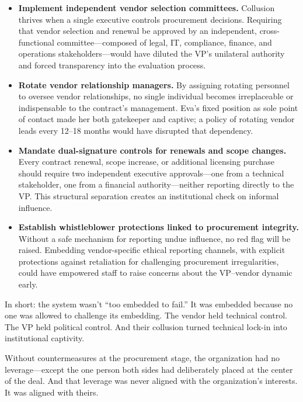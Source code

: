 \begin{itemize}
    \item \textbf{Implement independent vendor selection committees.} Collusion thrives when a single executive controls procurement decisions. Requiring that vendor selection and renewal be approved by an independent, cross-functional committee—composed of legal, IT, compliance, finance, and operations stakeholders—would have diluted the VP’s unilateral authority and forced transparency into the evaluation process.

    \item \textbf{Rotate vendor relationship managers.} By assigning rotating personnel to oversee vendor relationships, no single individual becomes irreplaceable or indispensable to the contract’s management. Eva’s fixed position as sole point of contact made her both gatekeeper and captive; a policy of rotating vendor leads every 12–18 months would have disrupted that dependency.

    \item \textbf{Mandate dual-signature controls for renewals and scope changes.} Every contract renewal, scope increase, or additional licensing purchase should require two independent executive approvals—one from a technical stakeholder, one from a financial authority—neither reporting directly to the VP. This structural separation creates an institutional check on informal influence.

    \item \textbf{Establish whistleblower protections linked to procurement integrity.} Without a safe mechanism for reporting undue influence, no red flag will be raised. Embedding vendor-specific ethical reporting channels, with explicit protections against retaliation for challenging procurement irregularities, could have empowered staff to raise concerns about the VP–vendor dynamic early.
\end{itemize}

In short: the system wasn’t “too embedded to fail.” It was embedded because no one was allowed to challenge its embedding. The vendor held technical control. The VP held political control. And their collusion turned technical lock-in into institutional captivity.

Without countermeasures at the procurement stage, the organization had no leverage—except the one person both sides had deliberately placed at the center of the deal. And that leverage was never aligned with the organization’s interests. It was aligned with theirs.

\medskip

